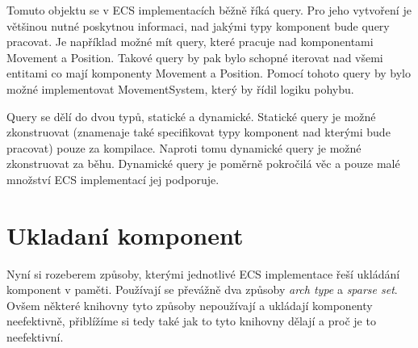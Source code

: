 Tomuto objektu se v ECS implementacích běžně říká query. Pro jeho vytvoření je většinou nutné poskytnou informaci, nad jakými typy komponent bude query pracovat. Je například možné mít query, které pracuje nad komponentami Movement a Position. Takové query by pak bylo schopné iterovat nad všemi entitami co mají komponenty Movement a Position. Pomocí tohoto query by bylo možné implementovat MovementSystem, který by řídil logiku pohybu.

Query se dělí do dvou typů, statické a dynamické. Statické query je možné zkonstruovat (znamenaje také specifikovat typy komponent nad kterými bude pracovat) pouze za kompilace. Naproti tomu dynamické query je možné zkonstruovat za běhu. Dynamické query je poměrně pokročilá věc a pouze malé množství ECS implementací jej podporuje.






\section{Ukladaní komponent}
Nyní si rozeberem způsoby, kterými jednotlivé ECS implementace řeší ukládání komponent v paměti. Používají se převážně dva způsoby \textit{arch type} a \textit{sparse set}. Ovšem některé knihovny tyto způsoby nepoužívají a ukládají komponenty neefektivně, přiblížíme si tedy také jak to tyto knihovny dělají a proč je to neefektivní.

